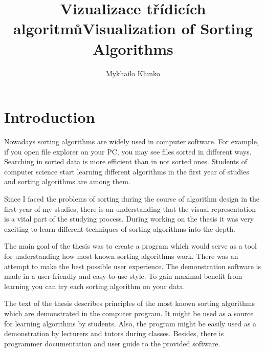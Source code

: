 \documentclass[
  field=inf,
  biblatex,
  language=english,
  glossaries,
  theorems=false,
  sourcecodes=false,
  index
]{kidiplom}
\title[czech]{Vizualizace třídicích algoritmů}
\title[english]{Visualization of Sorting Algorithms}
\author{Mykhailo Klunko}
\begin{document}
\maketitle



\newcommand{\BibLaTeX}{\textsc{Bib}\LaTeX}


\section{Introduction}

Nowadays sorting algorithms are widely used in computer software. For example, if you open file explorer on your PC, you may see files sorted in different ways. Searching in sorted data is more efficient than in not sorted ones. Students of computer science start learning different algorithms in the first year of studies and sorting algorithms are among them.

Since I faced the problems of sorting during the course of algorithm design in the first year of my studies, there is an understanding that the visual representation is a vital part of the studying process. During working on the thesis it was very exciting to learn different techniques of sorting algorithms into the depth.

The main goal of the thesis was to create a program which would serve as a tool for understanding how most known sorting algorithms work. There was an attempt to make the best possible user experience. The demonstration software is made in a user-friendly and easy-to-use style. To gain maximal benefit from learning you can try each sorting algorithm on your data. 

The text of the thesis describes principles of the most known sorting algorithms which are demonstrated in the computer program. It might be used as a source for learning algorithms by students. Also, the program might be easily used as a demonstration by lecturers and tutors during classes. Besides, there is programmer documentation and user guide to the provided software.
\end{document}
